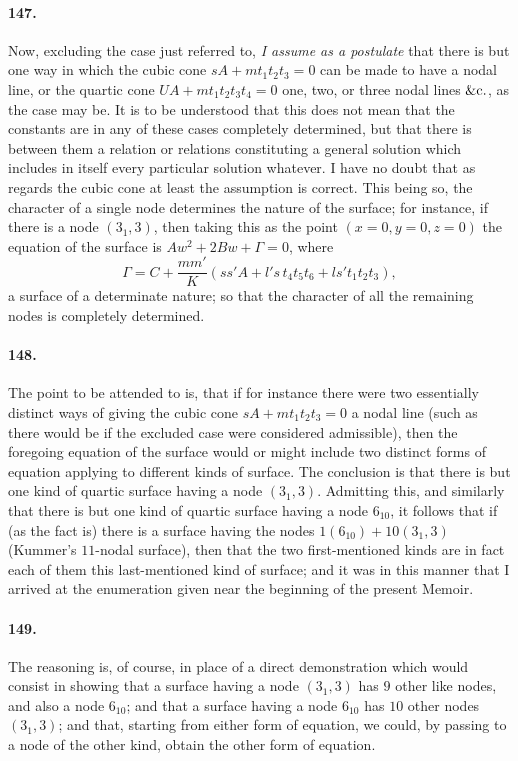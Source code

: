 \documentclass[11pt,a4paper]{article}
\begin{document}
\paragraph{147.}
Now, excluding the case just referred to, \textit{I assume as a
postulate} that there is but one way in which the cubic cone
$sA + m t_1 t_2 t_3 = 0$ can be made to have a nodal line, or the quartic
cone $UA + m t_1 t_2 t_3 t_4 = 0$ one, two, or three nodal lines $\&{\rm c}.$,
as the case may be. It is to be understood that this does not mean that
the constants are in any of these cases completely determined, but that
there is between them a relation or relations constituting a general
solution which includes in itself every particular solution whatever. I
have no doubt that as regards the cubic cone at least the assumption is
correct. This being so, the character of a single node determines the
nature of the surface; for instance, if there is a node $(3_1, 3)$, then
taking this as the point $(x = 0, y = 0, z = 0)$ the equation of the
surface is $Aw^2 + 2Bw + \Gamma = 0$, where
\[
\Gamma = C + \frac{m m'}{K}(s s' A + l' s\, t_4 t_5 t_6
+ l s' t_1 t_2 t_3),
\]
a surface of a determinate nature; so that the character of all the
remaining nodes is completely determined.

\paragraph{148.}
The point to be attended to is, that if for instance there were two
essentially distinct ways of giving the cubic cone $sA + m t_1 t_2 t_3 = 0$
a nodal line (such as there would be if the excluded case were considered
admissible), then the foregoing equation of the surface would or might
include two distinct forms of equation applying to different kinds of
surface. The conclusion is that there is but one kind of quartic surface
having a node $(3_1, 3)$. Admitting this, and similarly that there is but
one kind of quartic surface having a node $6_{10}$, it follows that if
(as the fact is) there is a surface having the nodes
$1(6_{10}) + 10(3_1, 3)$ (Kummer's $11$-nodal surface), then that the
two first-mentioned kinds are in fact each of them this last-mentioned
kind of surface; and it was in this manner that I arrived at the
enumeration given near the beginning of the present Memoir.

\paragraph{149.}
The reasoning is, of course, in place of a direct demonstration which
would consist in showing that a surface having a node $(3_1, 3)$ has $9$
other like nodes, and also a node $6_{10}$; and that a surface having a
node $6_{10}$ has $10$ other nodes $(3_1, 3)$; and that, starting from
either form of equation, we could, by passing to a node of the other
kind, obtain the other form of equation.
\end{document}
